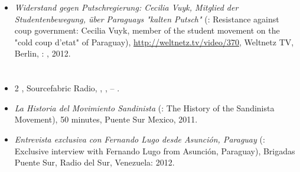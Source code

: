 {\begin{itemize}
\item \textit{Widerstand gegen Putschregierung: Cecilia Vuyk, Mitglied der Studentenbewegung, über Paraguays "kalten Putsch"} (\english: Resistance against coup government: Cecilia Vuyk, member of the student movement on the "cold coup d'etat" of Paraguay), \href{http://weltnetz.tv/video/370}{http://weltnetz.tv/video/370}, Weltnetz TV, Berlin, \Germany: , 2012.
\end{itemize}

\section*{\radioproductions}

\begin{itemize}
\item 2 \hours \show \with \music \und \interviews \inside \spanish \und \english, Sourcefabric Radio, \Czechrepublic, \every \Monday \und \Thursday, \September -- .
\item \textit{La Historia del Movimiento Sandinista} (\english: The History of the Sandinista Movement), 50 minutes, Puente Sur Mexico,  2011.
\item \textit{Entrevista exclusiva con Fernando Lugo desde Asunción, Paraguay} (\english: Exclusive interview with Fernando Lugo from Asunción, Paraguay), Brigadas Puente Sur, Radio del Sur, \Mexico \und Venezuela:  2012.
\end{itemize}
}
